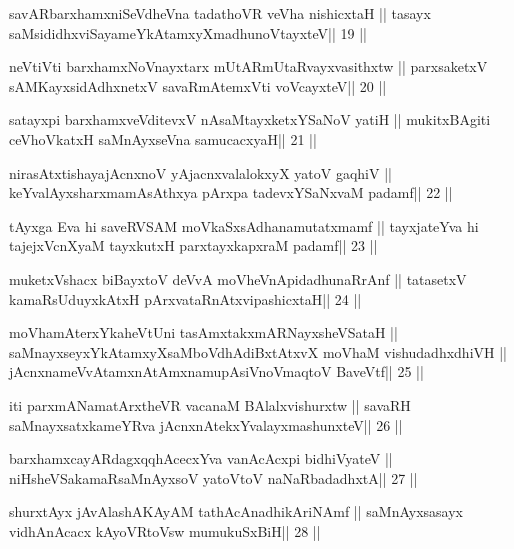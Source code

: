 \begin{shl}
savARbarxhamxniSeVdheVna tadathoVR veVha nishicxtaH ||
tasayx saMsididhxviSayameYkAtamxyXmadhunoVtayxteV\hfill || 19 ||
\end{shl}

\begin{shl}
neVtiVti barxhamxNoV\s nayxtarx mUtARmUtaRvayxvasithxtw ||
parxsaketxV sAMKayxsidAdhxnetxV savaRmAtemxVti voVcayxteV\hfill || 20 ||
\end{shl}

\begin{shl}
satayxpi barxhamxveVditevxV nAsaMtayxketxYSaNoV yatiH ||
mukitxBAgiti ceVhoVkatxH saMnAyxseVna samucacxyaH\hfill || 21 ||
\end{shl}

\begin{shl}
nirasAtxtishayajAcnxnoV yAjacnxvalalokxyX yatoV gaqhiV ||
keYvalAyxsharxmamAsAthxya pArxpa tadevxYSaNxvaM padamf\hfill || 22 ||
\end{shl}

\begin{shl}
tAyxga Eva hi saveRVSAM moVkaSxsAdhanamutatxmamf ||
tayxjateYva hi tajejxVcnXyaM tayxkutxH parxtayxkapxraM padamf\hfill || 23 ||
\end{shl}

\begin{shl}
muketxVshacx biBayxtoV deVvA moVheVnApidadhunaRrAnf ||
tatasetxV kamaRsUduyxkAtxH pArxvataRnAtxvipashicxtaH\hfill || 24 ||
\end{shl}

\begin{shl}
moVhamAterxYkaheVtUni tasAmxtakxmARNayxsheVSataH ||
saMnayxseyxYkAtamxyXsaMboVdhAdiBxtAtxvX moVhaM vishudadhxdhiVH ||
jAcnxnameVvA\s\s tamxnA\s\s tAmxnamupAsiVnoV\s maqtoV BaveVtf\hfill || 25 ||
\end{shl}

\begin{shl}
iti parxmANamatArxtheVR vacanaM BAlalxvishurxtw ||
savaRH saMnayxsatxkameYRva jAcnxnAtekxYvalayxmashunxteV\hfill || 26 ||
\end{shl}

\begin{shl}
barxhamxcayARdagxqqhAcecxYva vanAcAcxpi bidhiVyateV ||
niHsheVSakamaRsaMnAyxsoV yatoV\s toV naNaRbadadhxtA\hfill || 27 ||
\end{shl}

\begin{shl}
shurxtAyx jAvAlashAKAyAM tathAcAnadhikAriNAmf ||
saMnAyxsasayx vidhAnAcacx kAyoVR\s toV\s sw mumukuSxBiH\hfill || 28 ||
\end{shl}

